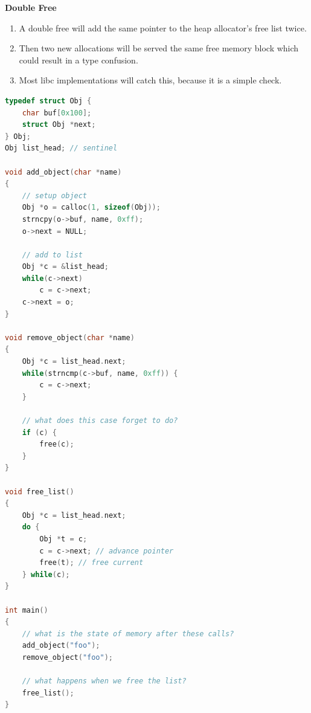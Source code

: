 \documentclass[12pt]{Training}
\begin{document}
\textbf{Double Free}
\begin{enumerate}
    \item A double free will add the same pointer to the heap allocator's free list twice.
    \item Then two new allocations will be served the same free memory block which could result in a type confusion.
	\item Most libc implementations will catch this, because it is a simple check.
\end{enumerate}
\begin{sectionbox}
\begin{lstlisting}[language=C, caption={Double Free}]
typedef struct Obj {
    char buf[0x100];
    struct Obj *next;
} Obj;
Obj list_head; // sentinel

void add_object(char *name)
{
    // setup object
    Obj *o = calloc(1, sizeof(Obj));
    strncpy(o->buf, name, 0xff);
    o->next = NULL;

    // add to list
    Obj *c = &list_head;
    while(c->next)
        c = c->next;
    c->next = o;
}

void remove_object(char *name)
{
    Obj *c = list_head.next;
    while(strncmp(c->buf, name, 0xff)) {
        c = c->next;
    }

    // what does this case forget to do?
    if (c) {
        free(c);
    }
}

void free_list()
{
    Obj *c = list_head.next;
    do {
        Obj *t = c;
        c = c->next; // advance pointer
        free(t); // free current
    } while(c);
}

int main()
{
    // what is the state of memory after these calls?
    add_object("foo");
    remove_object("foo");

    // what happens when we free the list?
    free_list();
}
\end{lstlisting}
\end{sectionbox}
\end{document}
